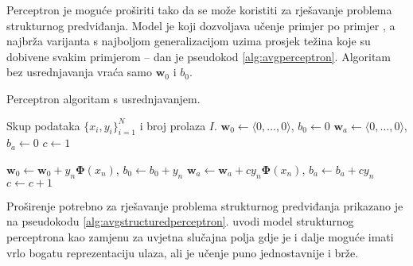 Perceptron \citep{rosenblatt1958perceptron} je moguće proširiti tako da se može
koristiti za rješavanje problema strukturnog predviđanja. Model je koji
dozvoljava učenje primjer po primjer , a najbrža varijanta
s najboljom generalizacijom uzima prosjek težina koje su dobivene svakim
primjerom \citep{freund1999large,gentile2002new} -- dan je pseudokod
\ref{alg:avgperceptron}. Algoritam bez usrednjavanja vraća samo $\mathbf{w}_0$ i
$b_0$.

\begin{algorithm}
\caption{Perceptron algoritam s usrednjavanjem.}\label{alg:avgperceptron}
\begin{algorithmic}[1]
\Require Skup podataka $\{x_i, y_i\}_{i=1}^N$ i broj prolaza $I$.
\State $\mathbf{w}_0 \gets \langle 0, \ldots, 0 \rangle$, $b_0 \gets 0$
\State $\mathbf{w}_a \gets \langle 0, \ldots, 0 \rangle$, $b_a \gets 0$
\State $c \gets 1$


    \State $\mathbf{w}_0 \gets \mathbf{w}_0 + y_n \mathbf{\Phi}(x_n)$, $b_0 \gets b_0 + y_n$
    \State $\mathbf{w}_a \gets \mathbf{w}_a + c y_n \mathbf{\Phi}(x_n)$, $b_a \gets b_a + c y_n$
    \EndIf
    \State $c \gets c + 1$
  \EndFor

\EndFor

\State {}
\end{algorithmic}
\end{algorithm}

Proširenje potrebno za rješavanje problema strukturnog predviđanja prikazano je
na pseudokodu \ref{alg:avgstructuredperceptron}.
\citet{collins2002discriminative} uvodi model strukturnog perceptrona
 kao zamjenu za uvjetna slučajna polja gdje je i
dalje moguće imati vrlo bogatu reprezentaciju ulaza, ali je učenje puno
jednostavnije i brže.

